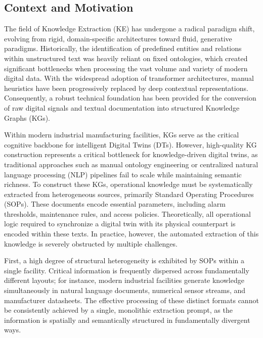 \documentclass[11pt]{article}
\begin{document}
\subsection{Context and Motivation}
The field of Knowledge Extraction (KE) has undergone a radical paradigm shift, evolving from rigid, domain-specific architectures toward fluid, generative paradigms. Historically, the identification of predefined entities and relations within unstructured text was heavily reliant on fixed ontologies, which created significant bottlenecks when processing the vast volume and variety of modern digital data. With the widespread adoption of transformer architectures, manual heuristics have been progressively replaced by deep contextual representations. Consequently, a robust technical foundation has been provided for the conversion of raw digital signals and textual documentation into structured Knowledge Graphs (KGs).

Within modern industrial manufacturing facilities, KGs serve as the critical cognitive backbone for intelligent Digital Twins (DTs). However, high-quality KG construction represents a critical bottleneck for knowledge-driven digital twins, as traditional approaches such as manual ontology engineering or centralized natural language processing (NLP) pipelines fail to scale while maintaining semantic richness. To construct these KGs, operational knowledge must be systematically extracted from heterogeneous sources, primarily Standard Operating Procedures (SOPs). These documents encode essential parameters, including alarm thresholds, maintenance rules, and access policies. Theoretically, all operational logic required to synchronize a digital twin with its physical counterpart is encoded within these texts. In practice, however, the automated extraction of this knowledge is severely obstructed by multiple challenges.

First, a high degree of structural heterogeneity is exhibited by SOPs within a single facility. Critical information is frequently dispersed across fundamentally different layouts; for instance, modern industrial facilities generate knowledge simultaneously in natural language documents, numerical sensor streams, and manufacturer datasheets. The effective processing of these distinct formats cannot be consistently achieved by a single, monolithic extraction prompt, as the information is spatially and semantically structured in fundamentally divergent ways. 
\end{document}

